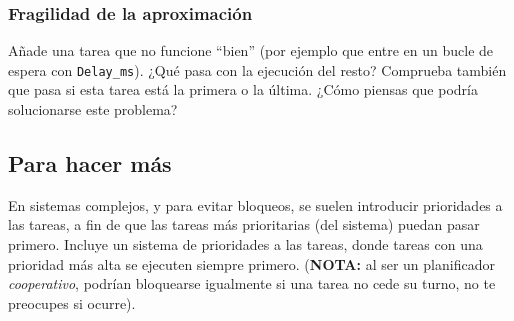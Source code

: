 \documentclass[../main.tex]{subfiles}
\begin{document}
            \subsubsection{Fragilidad de la aproximación}

                Añade una tarea que no funcione ``bien'' (por ejemplo que entre en un bucle de espera con \lstinline|Delay_ms|). ¿Qué pasa con la ejecución del resto? Comprueba también que pasa si esta tarea está la primera o la última. ¿Cómo piensas que podría solucionarse este problema?

    \subsection{Para hacer más}

        En sistemas complejos, y para evitar bloqueos, se suelen introducir prioridades a las tareas, a fin de que las tareas más prioritarias (del sistema) puedan pasar primero. Incluye un sistema de prioridades a las tareas, donde tareas con una prioridad más alta se ejecuten siempre primero. (\textbf{NOTA:} al ser un planificador \emph{cooperativo}, podrían bloquearse igualmente si una tarea no cede su turno, no te preocupes si ocurre).
 
\end{document}
